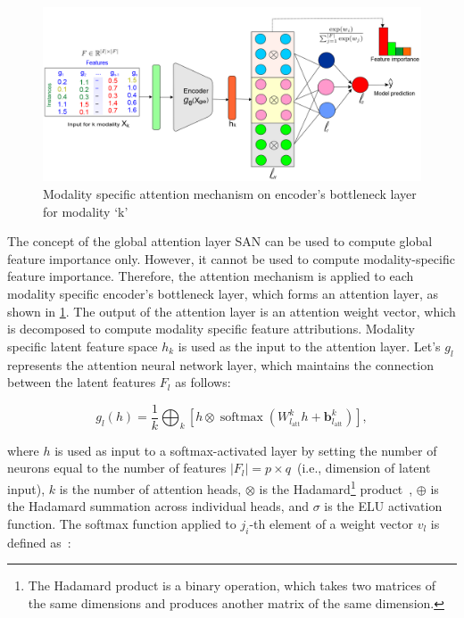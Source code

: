 \begin{figure}
	\centering
	\includegraphics[scale=0.55]{images/k_attention.png}
	\caption{Modality specific attention mechanism on encoder's bottleneck layer for modality `k'}	
	\label{fig:k_attention}
\end{figure}

\hspace*{3.5mm} The concept of the global attention layer SAN can be used to compute  global feature importance only. %
However, it cannot be used to compute modality-specific feature importance. Therefore, the attention mechanism is applied to each modality specific encoder's bottleneck layer, which forms an attention layer, as shown in \cref{fig:k_attention}. The output of the attention layer is an attention weight vector, which is decomposed to compute modality specific feature attributions.
Modality specific latent feature space $h_k$ is used as the input to the attention layer. Let's $g_l$ represents the attention neural network layer, which maintains the connection between the latent features $F_l$ as follows: 

\begin{equation}
    g_l(h)=\frac{1}{k} \bigoplus_{k}\left[h \otimes \operatorname{softmax}\left(W_{l_{\mathrm{att}}}^{k} h+\boldsymbol{b}_{l_{\mathrm{att}}}^{k}\right)\right],
\end{equation}

\hspace*{3.5mm} where $h$ is used as input to a softmax-activated layer by setting the number of neurons equal to the number of features $|F_l|= p \times q $~(i.e., dimension of latent input), $k$ is the number of attention heads, $\otimes$ is the Hadamard\footnote{The Hadamard product is a binary operation, which takes two matrices of the same dimensions and produces another matrix of the same dimension.} product~\cite{horn1990hadamard}, $\oplus$ is the Hadamard summation across individual heads, and $\sigma$ is the ELU activation function. The softmax function applied to $j_{i}$-th element of a weight vector $v_l$ is defined as~\cite{vskrlj2020feature}:

